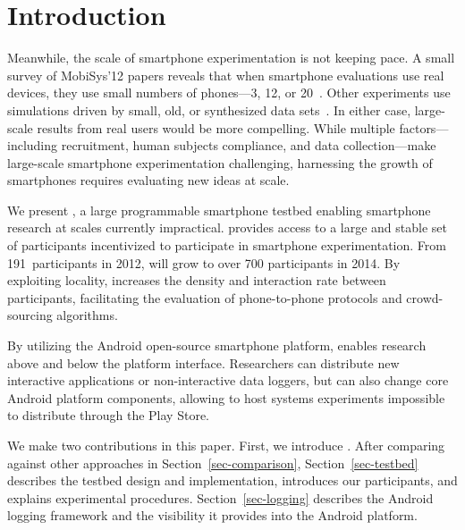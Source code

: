\section{Introduction}
\label{sec-introduction}


Meanwhile, the scale of smartphone experimentation is not keeping pace. A
small survey of MobiSys'12 papers reveals that when smartphone evaluations
use real devices, they use small numbers of phones---3, 12, or
20~\cite{nowar-mobisys12,comon-mobisys12,caching-mobisys12}. Other
experiments use simulations driven by small, old, or synthesized data
sets~\cite{falcon-mobisys12,ace-mobisys12,humanmobility-mobisys12}. In either
case, large-scale results from real users would be more compelling. While
multiple factors---including recruitment, human subjects compliance, and data
collection---make large-scale smartphone experimentation challenging, harnessing
the growth of smartphones requires evaluating new ideas at scale.

\vfill\eject

We present \PhoneLab{}, a large programmable smartphone testbed enabling
smartphone research at scales currently impractical. \PhoneLab{} provides
access to a large and stable set of participants incentivized to participate
in smartphone experimentation. From 191~participants in 2012, \PhoneLab{}
will grow to over 700 participants in 2014. By exploiting locality,
\PhoneLab{} increases the density and interaction rate between participants,
facilitating the evaluation of phone-to-phone protocols and crowd-sourcing
algorithms.

By utilizing the Android open-source smartphone platform, \PhoneLab{} enables
research above and below the platform interface. Researchers can distribute
new interactive applications or non-interactive data loggers, but can also
change core Android platform components, allowing \PhoneLab{} to host systems
experiments impossible to distribute through the Play Store.

We make two contributions in this paper. First, we introduce \PhoneLab{}.
After comparing against other approaches in Section~\ref{sec-comparison},
Section~\ref{sec-testbed} describes the testbed design and implementation,
introduces our participants, and explains experimental procedures.
Section~\ref{sec-logging} describes the Android logging framework and the
visibility it provides into the Android platform.

